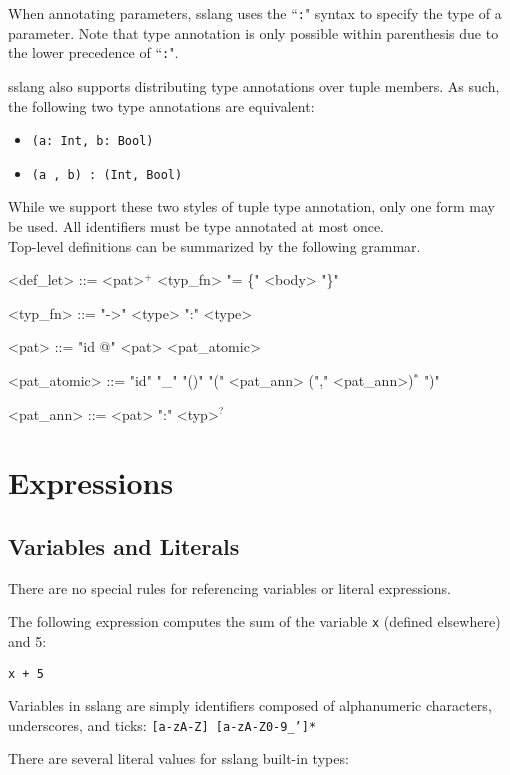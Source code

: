\documentclass{article}
\begin{document}
When annotating parameters, sslang uses the ``\texttt{:}" syntax to specify the type of a parameter. Note that type annotation is only possible within parenthesis due to the lower precedence of ``\texttt{:}".

sslang also supports distributing type annotations over tuple members. As such, the following two type annotations are equivalent:
\begin{itemize}
    \item \texttt{(a: Int, b: Bool)}
    \item \texttt{(a , b) : (Int, Bool)}
\end{itemize}

While we support these two styles of tuple type annotation, only one form may be used. All identifiers must be type annotated at most once. \\

Top-level definitions can be summarized by the following grammar.
\setlength{\grammarindent}{9em}
\begin{grammar}
<def_let> ::= <pat>$^{+}$ <typ_fn> "= \{" <body> "\}"

<typ_fn> ::= "->" <type>
\alt ":" <type>

<pat> ::= "id @" <pat>
\alt <pat_atomic>

<pat_atomic> ::= "id"
\alt "_"
\alt "()"
\alt "(" <pat_ann> ("," <pat_ann>)$^{*}$ ")"

<pat_ann> ::= <pat> ":" <typ>$^{?}$
\end{grammar}

\section{Expressions}
\subsection{Variables and Literals}
There are no special rules for referencing variables or literal expressions.

The following expression computes the sum of the variable \texttt{x} (defined elsewhere) and 5:
\begin{lstlisting}
x + 5
\end{lstlisting}

Variables in sslang are simply identifiers composed of alphanumeric characters, underscores, and ticks: \texttt{[a-zA-Z] [a-zA-Z0-9_']*}

There are several literal values for sslang built-in types:
\end{document}
